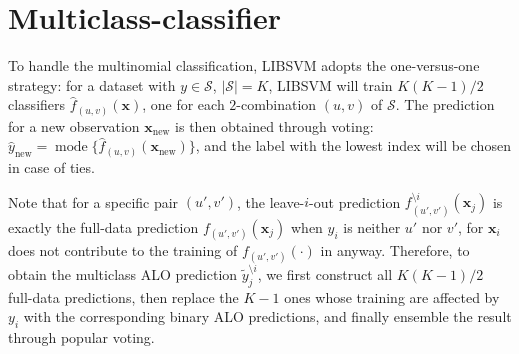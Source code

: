 \documentclass[11pt]{article}
\newcommand{\bx}{\bm{x}}
\DeclareMathOperator{\mode}{mode}
\begin{document}
\section{Multiclass-classifier}
To handle the multinomial classification, LIBSVM adopts the one-versus-one strategy: for a dataset with \(y\in\mathcal{S}\), \(|\mathcal{S}|=K\), LIBSVM will train \(K(K-1)/2\) classifiers \(\hat{f}_{(u,v)}(\bx)\), one for each \(2\)-combination \((u,v)\) of \(\mathcal{S}\). The prediction for a new observation \(\bx_\text{new}\) is then obtained through voting: \(\hat{y}_\text{new}=\mode\{\hat{f}_{(u,v)}(\bx_\text{new})\}\), and the label with the lowest index will be chosen in case of ties.

Note that for a specific pair \((u',v')\), the leave-\(i\)-out prediction \(f_{(u',v')}^{\setminus i}(\bx_j)\) is exactly the full-data prediction \(f_{(u',v')}(\bx_j)\) when \(y_i\) is neither \(u'\) nor \(v'\), for \(\bx_i\) does not contribute to the training of \(f_{(u',v')}(\cdot)\) in anyway. Therefore, to obtain the multiclass ALO prediction \(\tilde{y}_j^{\setminus i}\), we first construct all \(K(K-1)/2\) full-data predictions, then replace the \(K-1\) ones whose training are affected by \(y_i\) with the corresponding binary ALO predictions, and finally ensemble the result through popular voting.
\end{document}
